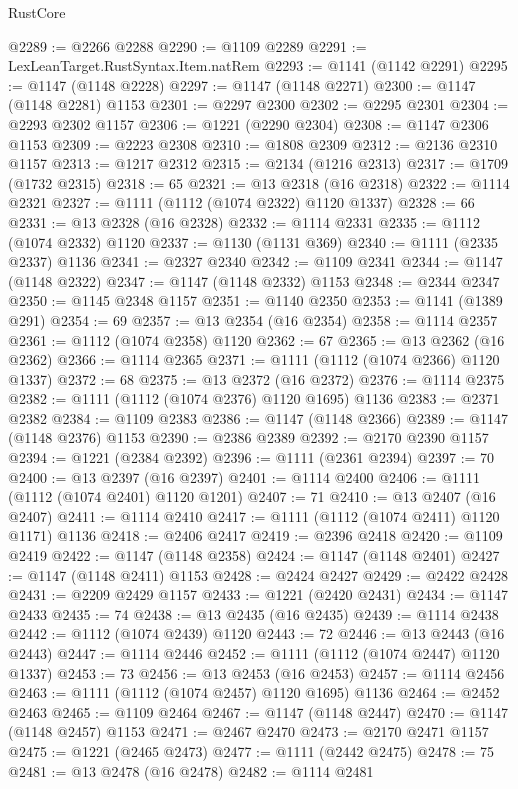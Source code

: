 \begin{lexlean}{RustCore}
\begin{coremodule}
@2289 := @2266 @2288
@2290 := @1109 @2289
@2291 := LexLeanTarget.RustSyntax.Item.natRem
@2293 := @1141 (@1142 @2291)
@2295 := @1147 (@1148 @2228)
@2297 := @1147 (@1148 @2271)
@2300 := @1147 (@1148 @2281) @1153
@2301 := @2297 @2300
@2302 := @2295 @2301
@2304 := @2293 @2302 @1157
@2306 := @1221 (@2290 @2304)
@2308 := @1147 @2306 @1153
@2309 := @2223 @2308
@2310 := @1808 @2309
@2312 := @2136 @2310 @1157
@2313 := @1217 @2312
@2315 := @2134 (@1216 @2313)
@2317 := @1709 (@1732 @2315)
@2318 := 65
@2321 := @13 @2318 (@16 @2318)
@2322 := @1114 @2321
@2327 := @1111 (@1112 (@1074 @2322) @1120 @1337)
@2328 := 66
@2331 := @13 @2328 (@16 @2328)
@2332 := @1114 @2331
@2335 := @1112 (@1074 @2332) @1120
@2337 := @1130 (@1131 @369)
@2340 := @1111 (@2335 @2337) @1136
@2341 := @2327 @2340
@2342 := @1109 @2341
@2344 := @1147 (@1148 @2322)
@2347 := @1147 (@1148 @2332) @1153
@2348 := @2344 @2347
@2350 := @1145 @2348 @1157
@2351 := @1140 @2350
@2353 := @1141 (@1389 @291)
@2354 := 69
@2357 := @13 @2354 (@16 @2354)
@2358 := @1114 @2357
@2361 := @1112 (@1074 @2358) @1120
@2362 := 67
@2365 := @13 @2362 (@16 @2362)
@2366 := @1114 @2365
@2371 := @1111 (@1112 (@1074 @2366) @1120 @1337)
@2372 := 68
@2375 := @13 @2372 (@16 @2372)
@2376 := @1114 @2375
@2382 := @1111 (@1112 (@1074 @2376) @1120 @1695) @1136
@2383 := @2371 @2382
@2384 := @1109 @2383
@2386 := @1147 (@1148 @2366)
@2389 := @1147 (@1148 @2376) @1153
@2390 := @2386 @2389
@2392 := @2170 @2390 @1157
@2394 := @1221 (@2384 @2392)
@2396 := @1111 (@2361 @2394)
@2397 := 70
@2400 := @13 @2397 (@16 @2397)
@2401 := @1114 @2400
@2406 := @1111 (@1112 (@1074 @2401) @1120 @1201)
@2407 := 71
@2410 := @13 @2407 (@16 @2407)
@2411 := @1114 @2410
@2417 := @1111 (@1112 (@1074 @2411) @1120 @1171) @1136
@2418 := @2406 @2417
@2419 := @2396 @2418
@2420 := @1109 @2419
@2422 := @1147 (@1148 @2358)
@2424 := @1147 (@1148 @2401)
@2427 := @1147 (@1148 @2411) @1153
@2428 := @2424 @2427
@2429 := @2422 @2428
@2431 := @2209 @2429 @1157
@2433 := @1221 (@2420 @2431)
@2434 := @1147 @2433
@2435 := 74
@2438 := @13 @2435 (@16 @2435)
@2439 := @1114 @2438
@2442 := @1112 (@1074 @2439) @1120
@2443 := 72
@2446 := @13 @2443 (@16 @2443)
@2447 := @1114 @2446
@2452 := @1111 (@1112 (@1074 @2447) @1120 @1337)
@2453 := 73
@2456 := @13 @2453 (@16 @2453)
@2457 := @1114 @2456
@2463 := @1111 (@1112 (@1074 @2457) @1120 @1695) @1136
@2464 := @2452 @2463
@2465 := @1109 @2464
@2467 := @1147 (@1148 @2447)
@2470 := @1147 (@1148 @2457) @1153
@2471 := @2467 @2470
@2473 := @2170 @2471 @1157
@2475 := @1221 (@2465 @2473)
@2477 := @1111 (@2442 @2475)
@2478 := 75
@2481 := @13 @2478 (@16 @2478)
@2482 := @1114 @2481

\end{coremodule}
\end{lexlean}
